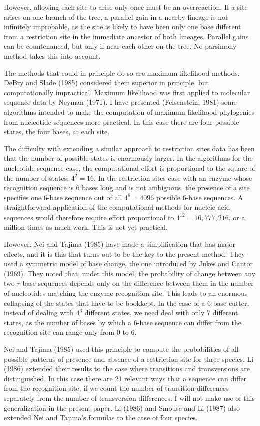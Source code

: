 However, allowing each site to arise only once must be an overreaction.  
If a site arises on one branch of the tree, a parallel gain in a nearby
lineage is not infinitely improbable, as the site is likely to have been only
one base different from a restriction site in the immediate ancestor of both
lineages.  Parallel gains can be countenanced, but only if near each other
on the tree.  No parsimony method takes this into account.

The methods that could in principle do so are maximum likelihood methods.
DeBry and Slade (1985) considered them superior in principle, but
computationally impractical.  Maximum likelihood was first applied to
molecular sequence data by Neyman (1971).  I have presented (Felsenstein,
1981) some algorithms
intended to make the computation of maximum likelihood phylogenies from
nucleotide sequences more practical.  In this case there are four possible
states, the four bases, at each site.

The difficulty with extending a similar approach to restriction sites data
has been that the number of possible states is enormously larger.  In the
algorithms for the nucleotide sequence case, the computational effort is
proportional to the square of the number of states, $4^2 = 16$.  In the
restriction sites case with an enzyme whose recognition sequence is 6 bases
long and is not ambiguous, the presence of a site specifies one 6-base
sequence out of all $4^6 = 4096$ possible 6-base sequences.  A
straightforward application of the computational methods for nucleic acid
sequences would therefore require effort proportional to $4^{12} = 16,777,216$,
or a million times as much work.  This is not yet practical.

However, Nei and Tajima (1985) have made a simplification that has major
effects, and it is this that turns out to be the key to the present
method.  They
used a symmetric model of base change, the one introduced by Jukes and
Cantor (1969).  They noted that, under this model, the probability of change
between any two $r$-base sequences depends only on the difference between them
in the number of nucleotides matching the enzyme recognition site.  This
leads to an enormous collapsing of the states that have to be bookkept.
In the case of a 6-base cutter, instead of dealing with $4^6$ different states,
we need deal with only 7 different states, as the number of bases by which a
6-base sequence can differ from the recognition site can range only from 0 to 6.

Nei and Tajima (1985) used this principle to compute the probabilities of
all possible patterns of presence and absence of a restriction site for
three species.  Li (1986) extended their results to the case
where transitions and transversions are distinguished.  In this case there
are 21 relevant ways that a sequence can differ from the recognition site,
if we count the number of transition differences separately from the number
of transversion differences.  I will not make use of this generalization in
the present paper.  Li (1986) and Smouse and Li (1987) also extended Nei and
Tajima's formulas to the case of four species.

